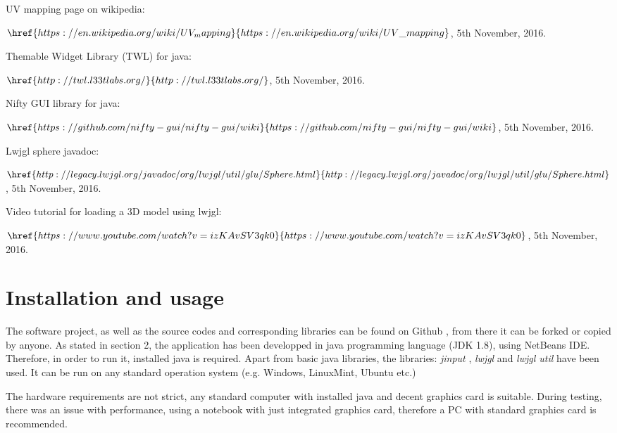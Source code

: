 \documentclass[english,12pt,a4paper,pdftex,elec,utf8]{aaltothesis}
\begin{document}
\begin{thebibliography}{99}
 UV mapping page on wikipedia:

    $\href{https://en.wikipedia.org/wiki/UV_mapping}{https://en.wikipedia.org/wiki/UV\_mapping}$,
  5th November, 2016.

 Themable Widget Library (TWL) for java:

    $\href{http://twl.l33tlabs.org/}{http://twl.l33tlabs.org/}$,
  5th November, 2016.

 Nifty GUI library for java:

    $\href{https://github.com/nifty-gui/nifty-gui/wiki}{https://github.com/nifty-gui/nifty-gui/wiki}$,
  5th November, 2016.

 Lwjgl sphere javadoc:

    $\href{http://legacy.lwjgl.org/javadoc/org/lwjgl/util/glu/Sphere.html}{http://legacy.lwjgl.org/javadoc/org/lwjgl/util/glu/Sphere.html}$,
  5th November, 2016.

 Video tutorial for loading a 3D model using lwjgl:

    $\href{https://www.youtube.com/watch?v=izKAvSV3qk0}{https://www.youtube.com/watch?v=izKAvSV3qk0}$,
  5th November, 2016.

\end{thebibliography}

\clearpage

\thesisappendix

\section{Installation and usage\label{LiiteA}}

The software project, as well as the source codes and corresponding libraries can be found on Github \cite{gitHub}, from there it can be forked or copied by anyone. 
As stated in section 2, the application has been developped in java programming language (JDK 1.8), using NetBeans IDE. Therefore, in order to run it, installed java is required. Apart from basic java libraries, the libraries: \textit{jinput} \cite{jinput}, \textit{lwjgl} \cite{lwjgl} and \textit{lwjgl util} \cite{lwjglUtil} have been used. It can be run on any standard operation system (e.g. Windows, LinuxMint, Ubuntu etc.)

The hardware requirements are not strict, any standard computer with installed java and decent graphics card is suitable. During testing, there was an issue with performance, using a notebook with just integrated graphics card, therefore a PC with standard graphics card is recommended. 
\end{document}
